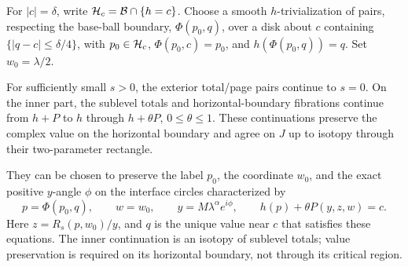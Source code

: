 For \(|c|=\delta\), write \(\mathcal H_c=\mathcal B\cap\{h=c\}\).
Choose a smooth \(h\)-trivialization of pairs, respecting the
base-ball boundary, \(\Phi(p_0,q)\), over a disk about \(c\)
containing \(\{|q-c|\le\delta/4\}\), with
\(p_0\in\mathcal H_c\), \(\Phi(p_0,c)=p_0\), and
\(h(\Phi(p_0,q))=q\). Set \(w_0=\lambda/2\).

\begin{lemma}\label{lem:continuations}
For sufficiently small \(s>0\), the exterior total/page pairs continue
to \(s=0\). On the inner part, the sublevel totals and
horizontal-boundary fibrations continue from \(h+P\) to \(h\)
through \(h+\theta P\), \(0\le\theta\le1\). These continuations preserve the complex
value on the horizontal boundary and agree on \(J\) up to isotopy
through their two-parameter rectangle.

They can be chosen to preserve the label \(p_0\), the coordinate
\(w_0\), and the exact positive \(y\)-angle \(\phi\) on the
interface circles characterized by
\[
 p=\Phi(p_0,q),\qquad w=w_0,\qquad
 y=M\lambda^\alpha e^{i\phi},\qquad h(p)+\theta P(y,z,w)=c.
\]
Here \(z=R_s(p,w_0)/y\), and \(q\) is the unique value near \(c\)
that satisfies these equations. The inner continuation is an isotopy
of sublevel totals; value preservation is required on its horizontal
boundary, not through its critical region.
\end{lemma}
